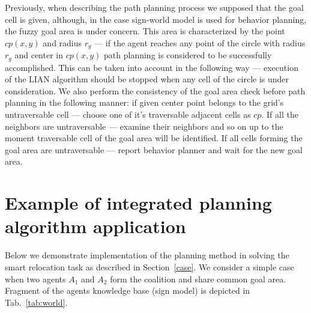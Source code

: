 \documentclass[runningheads,a4paper]{llncs}
\begin{document}
Previously, when describing the path planning process we supposed that the goal cell is given, although, in the case sign-world model is used for behavior planning, the fuzzy goal area is under concern. This area is characterized by the point $cp(x, y)$ and radius $r_g$ --- if the agent reaches any point of the circle with radius $r_g$ and center in $cp(x, y)$ path planning is considered to be successfully accomplished. This can be taken into account in the following way --- execution of the LIAN algorithm should be stopped when any cell of the circle is under consideration. We also perform the consistency of the goal area check before path planning in the following manner: if given center point belongs to the grid's untraversable cell --- choose one of it's traversable adjacent cells as $cp$. If all the neighbors are untraversable --- examine their neighbors and so on up to the moment traversable cell of the goal area will be identified. If all cells forming the goal area are untraversable --- report  behavior planner and wait for the new goal area. 

\section{Example of integrated planning algorithm application}\label{example}

Below we demonstrate implementation of the planning method in solving the smart relocation task as described in Section~\ref{case}. We consider a simple case when two agents $A_1$ and $A_2$ form the coalition and share common goal area. Fragment of the agents knowledge base (sign model) is depicted in Tab.~\ref{tab:world}.
\end{document}
